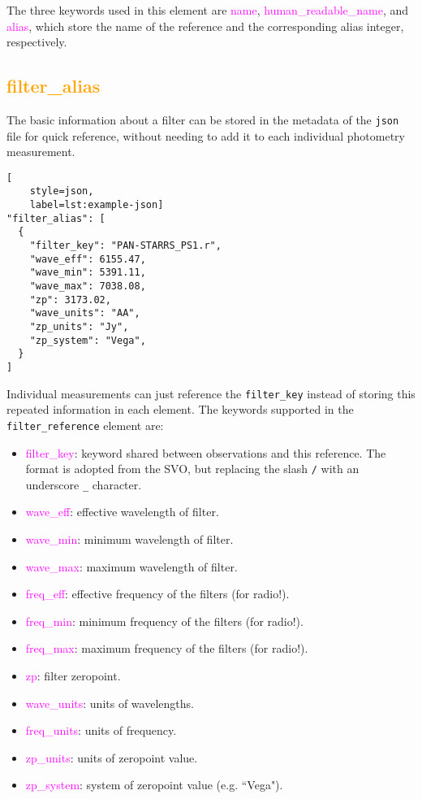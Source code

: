 \documentclass[tighten]{aastex631}
\newcommand{\element}[1]{\textcolor{orange}{#1}}
\newcommand{\keyword}[1]{\textcolor{magenta}{#1}}
\begin{document}
The three keywords used in this element are \keyword{name}, \keyword{human\_readable\_name}, and \keyword{alias}, which store the name of the reference and the corresponding alias integer, respectively. 

\subsection{\element{filter\_alias}} \label{sec:filter_alias}

The basic information about a filter can be stored in the metadata of the {\tt json} file for quick reference, without needing to add it to each individual photometry measurement.

\begin{lstlisting}[
    style=json,
    label=lst:example-json]
"filter_alias": [
  {
    "filter_key": "PAN-STARRS_PS1.r",
    "wave_eff": 6155.47,
    "wave_min": 5391.11,
    "wave_max": 7038.08,
    "zp": 3173.02,
    "wave_units": "AA",
    "zp_units": "Jy",
    "zp_system": "Vega",
  }
]
\end{lstlisting}

Individual measurements can just reference the {\tt filter\_key} instead of storing this repeated information in each element. The keywords supported in the {\tt filter\_reference} element are:

\begin{itemize}
    \item \keyword{filter\_key}: keyword shared between observations and this reference. The format is adopted from the SVO, but replacing the slash {\tt /} with an underscore {\tt \_} character.
    \item \keyword{wave\_eff}: effective wavelength of filter.
    \item \keyword{wave\_min}: minimum wavelength of filter.
    \item \keyword{wave\_max}: maximum wavelength of filter.
    \item \keyword{freq\_eff}: effective frequency of the filters (for radio!).
    \item \keyword{freq\_min}: minimum frequency of the filters (for radio!).
    \item \keyword{freq\_max}: maximum frequency of the filters (for radio!).
    \item \keyword{zp}: filter zeropoint.
    \item \keyword{wave\_units}: units of wavelengths.
    \item \keyword{freq\_units}: units of frequency.
    \item \keyword{zp\_units}: units of zeropoint value.
    \item \keyword{zp\_system}: system of zeropoint value (e.g. ``Vega").
\end{itemize}
\end{document}

